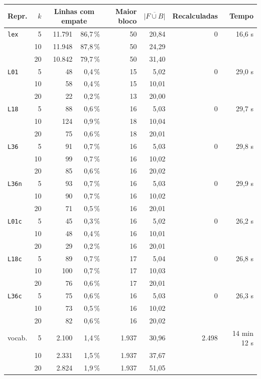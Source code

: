 \footnotesize
\begin{tabular}{lrrrrrrr}
\toprule
Repr. & $k$ & \multicolumn{2}{c}{Linhas com empate} & Maior bloco & $\overline{|F\cup B|}$ & Recalculadas & Tempo \\
\midrule
\texttt{lex} & 5 & 11.791 & 86,7\,\% & 50 & 20,84 & 0 & 16,6 s \\
 & 10 & 11.948 & 87,8\,\% & 50 & 24,29 &  &  \\
 & 20 & 10.842 & 79,7\,\% & 50 & 31,40 &  &  \\
\texttt{L01} & 5 & 48 & 0,4\,\% & 15 & 5,02 & 0 & 29,0 s \\
 & 10 & 58 & 0,4\,\% & 15 & 10,01 &  &  \\
 & 20 & 22 & 0,2\,\% & 13 & 20,00 &  &  \\
\texttt{L18} & 5 & 88 & 0,6\,\% & 16 & 5,03 & 0 & 29,7 s \\
 & 10 & 124 & 0,9\,\% & 18 & 10,04 &  &  \\
 & 20 & 75 & 0,6\,\% & 18 & 20,01 &  &  \\
\texttt{L36} & 5 & 91 & 0,7\,\% & 16 & 5,03 & 0 & 29,8 s \\
 & 10 & 99 & 0,7\,\% & 16 & 10,02 &  &  \\
 & 20 & 85 & 0,6\,\% & 16 & 20,02 &  &  \\
\texttt{L36n} & 5 & 93 & 0,7\,\% & 16 & 5,03 & 0 & 29,9 s \\
 & 10 & 90 & 0,7\,\% & 16 & 10,02 &  &  \\
 & 20 & 71 & 0,5\,\% & 16 & 20,01 &  &  \\
\texttt{L01c} & 5 & 45 & 0,3\,\% & 16 & 5,02 & 0 & 26,2 s \\
 & 10 & 48 & 0,4\,\% & 16 & 10,01 &  &  \\
 & 20 & 29 & 0,2\,\% & 16 & 20,01 &  &  \\
\texttt{L18c} & 5 & 89 & 0,7\,\% & 17 & 5,04 & 0 & 26,8 s \\
 & 10 & 100 & 0,7\,\% & 17 & 10,03 &  &  \\
 & 20 & 76 & 0,6\,\% & 17 & 20,01 &  &  \\
\texttt{L36c} & 5 & 75 & 0,6\,\% & 16 & 5,03 & 0 & 26,3 s \\
 & 10 & 73 & 0,5\,\% & 16 & 10,02 &  &  \\
 & 20 & 82 & 0,6\,\% & 16 & 20,02 &  &  \\
\midrule
vocab. & 5 & 2.100 & 1,4\,\% & 1.937 & 30,96 & 2.498 & 14 min 12 s \\
 & 10 & 2.331 & 1,5\,\% & 1.937 & 37,67 &  &  \\
 & 20 & 2.824 & 1,9\,\% & 1.937 & 51,05 &  &  \\
\bottomrule
\end{tabular}

\par{}
